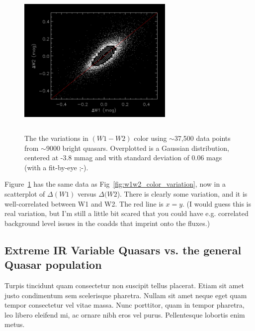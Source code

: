 \documentclass{emulateapj}
\begin{document}
    \begin{figure}
      \includegraphics[width=7.50cm, height=7.50cm, 
      trim=0.0cm 0.0cm 0.0cm 0.0cm, clip]
      {scatter_dW1_dW2.png}
      \centering
      \caption[]{The the variations in $(W1-W2)$ color using
        $\sim$37,500 data points from $\sim$9000 bright quasars. Overplotted
        is a Gaussian distribution, centered at -3.8 mmag and with standard
        deviation of 0.06 mags (with a fit-by-eye ;-).}
      \label{fig:scatter_dW1_dW2}
    \end{figure}
    Figure~\ref{fig:scatter_dW1_dW2} has the same data as
    Fig~\ref{fig:w1w2_color_variation}, now in a scatterplot of
    $\Delta(W1)$ versus $\Delta(W2$). There is clearly some variation, and
    it is well-correlated between W1 and W2. The red line is $x=y$. 
    (I would guess this is real variation, but I'm still a little bit scared that
    you could have e.g. correlated background level issues in the coadds
    that imprint onto the fluxes.)

    \subsection{Extreme IR Variable Quasars vs. the general Quasar population}
    Turpis tincidunt quam consectetur non suscipit tellus placerat. Etiam
    sit amet justo condimentum sem scelerisque pharetra. Nullam sit amet
    neque eget quam tempor consectetur vel vitae massa. Nunc porttitor,
    quam in tempor pharetra, leo libero eleifend mi, ac ornare nibh eros
    vel purus. Pellentesque lobortis enim metus.
    

\end{document}
